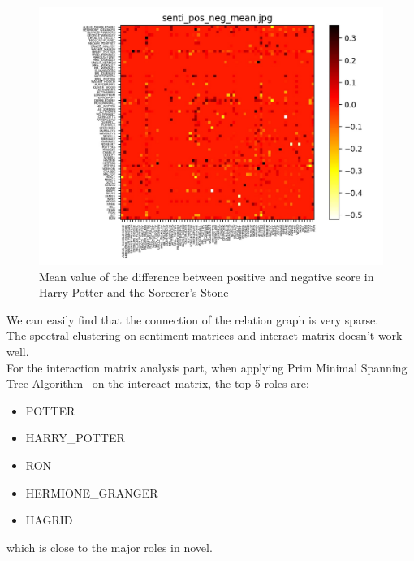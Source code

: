 \documentclass[11pt]{article}
\begin{document}
    \begin{figure}[H]
        \centering
        \includegraphics[width=\linewidth]{images/senti_pos_neg_mean.jpg}
        \caption{Mean value of the difference between positive and negative score in Harry Potter and the Sorcerer's Stone}
    \end{figure}
    We can easily find that the connection of the relation graph is very sparse. \\
    The spectral clustering on sentiment matrices and interact matrix doesn't work well. \\
    
    For the interaction matrix analysis part, when applying Prim Minimal Spanning Tree Algorithm~\cite{prim} on the intereact matrix, the top-5 roles are: \\
    \begin{itemize}
        \item POTTER
        \item HARRY\_POTTER
        \item RON
        \item HERMIONE\_GRANGER
        \item HAGRID
    \end{itemize}
    which is close to the major roles in novel.
    
\end{document}
